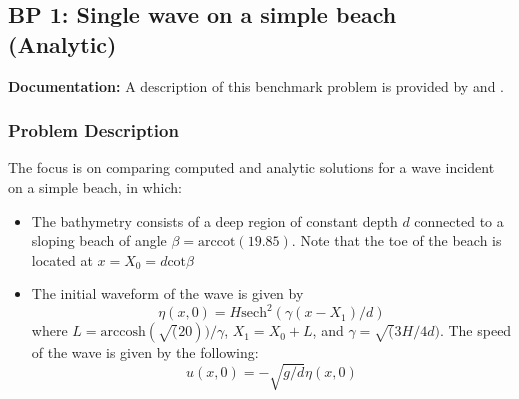 \newsection
\subsection{BP 1: Single wave on a simple beach (Analytic)}

{\bf Documentation:} A description of this benchmark problem is provided by \cite{bp-description} and \cite{SynolakisBernard:pmel135}.

\subsubsection{Problem Description}
The focus is on comparing computed and analytic solutions for a wave incident on a simple beach, in which:
\begin{itemize}
\item The bathymetry consists of a deep region of constant depth $d$
connected to a sloping beach of angle $\beta = \text{arccot}(19.85)$. 
Note that the toe of the beach is located at $x = X_0 = d \text{cot} \beta$
\item The initial waveform of the wave is given by 
\begin{equation}
\eta(x,0) = H \text{sech}^2(\gamma (x - X_1)/d)
\end{equation}
where $L = \text{arccosh}(\sqrt(20))/\gamma$, $X_1 = X_0 + L$, 
and $\gamma = \sqrt(3H/4d)$. The speed of the wave is given by the following: 
\begin{equation}
u(x,0)=-\sqrt{g/d}\eta(x,0)
\end{equation}
\end{itemize}

